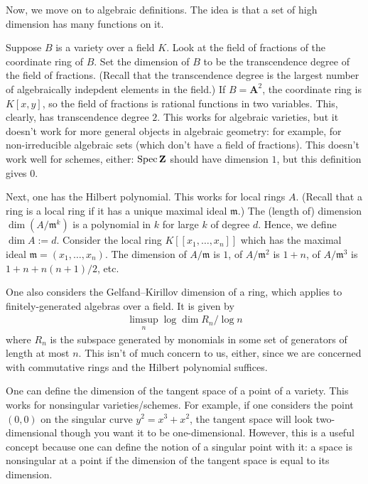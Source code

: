 \documentclass[11pt, oneside,margin=1in]{article}
\begin{document}
Now, we move on to algebraic definitions. The idea is that a set of high dimension has many functions on it.

Suppose $B$ is a variety over a field $K$. Look at the field of fractions of the coordinate ring of $B$. Set the dimension of $B$ to be the transcendence degree of the field of fractions. (Recall that the transcendence degree is the largest number of algebraically indepdent elements in the field.) If $B=\mathbf{A}^2$, the coordinate ring is $K[x,y]$, so the field of fractions is rational functions in two variables. This, clearly, has transcendence degree $2$. This works for algebraic varieties, but it doesn't work for more general objects in algebraic geometry: for example, for non-irreducible algebraic sets (which don't have a field of fractions). This doesn't work well for schemes, either: $\operatorname{Spec} \mathbf Z$ should have dimension $1$, but this definition gives $0$.

Next, one has the Hilbert polynomial. This works for local rings $A$. (Recall that a ring is a local ring if it has a unique maximal ideal $\mathfrak{m}$.) The (length of) dimension $\dim(A/\mathfrak{m}^k)$ is a polynomial in $k$ for large $k$ of degree $d$. Hence, we define $\dim A := d$. Consider the local ring $K [\![x_1,\hdots, x_n]\!]$ which has the maximal ideal $\mathfrak{m} = (x_1,\hdots, x_n)$. The dimension of $A/\mathfrak{m}$ is $1$, of $A/\mathfrak{m}^2$ is $1+n$, of $A/\mathfrak{m}^3$ is $1+n+n(n+1)/2$, etc.

One also considers the Gelfand--Kirillov dimension of a ring, which applies to finitely-generated algebras over a field. It is given by
\begin{align*}
	\limsup_{n} \log \dim R_n / \log n
\end{align*}
where $R_n$ is the subspace generated by monomials in some set of generators of length at most $n$. This isn't of much concern to us, either, since we are concerned with commutative rings and the Hilbert polynomial suffices.

One can define the dimension of the tangent space of a point of a variety. This works for nonsingular varieties/schemes. For example, if one considers the point $(0,0)$ on the singular curve $y^2=x^3+x^2$, the tangent space will look two-dimensional though you want it to be one-dimensional. However, this is a useful concept because one can define the notion of a singular point with it: a space is nonsingular at a point if the dimension of the tangent space is equal to its dimension.
\end{document}
